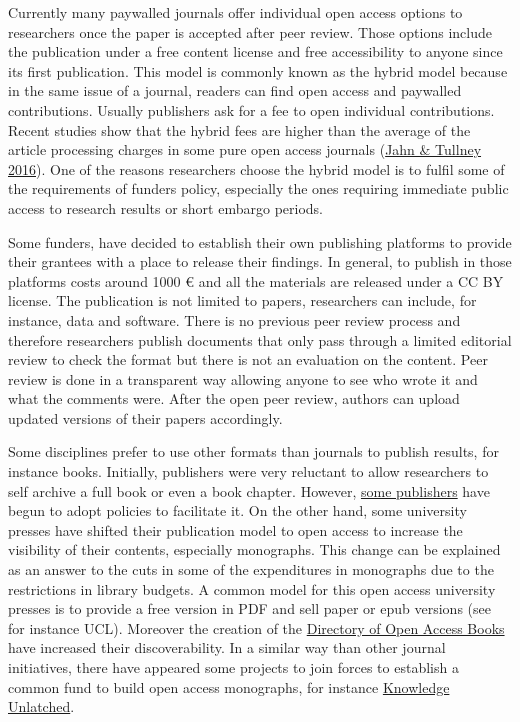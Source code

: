 \documentclass{article}
\begin{document}
Currently many paywalled journals offer individual open access options to researchers once the paper is accepted after peer review. Those options include the publication under a free content license and free accessibility to anyone since its first publication. This model is commonly known as the hybrid model because in the same issue of a journal, readers can find open access and paywalled contributions. Usually publishers ask for a fee to open individual contributions. Recent studies show that the hybrid fees are higher than the average of the article processing charges in some pure open access journals (\href{https://doi.org/10/bnqm}{Jahn \& Tullney 2016}). One of the reasons researchers choose the hybrid model is to fulfil some of the requirements of funders policy, especially the ones requiring immediate public access to research results or short embargo periods.


Some funders, have decided to establish their own publishing platforms to provide their grantees with a place to release their findings. In general, to publish in those platforms costs around 1000 € and all the materials are released under a CC BY license. The publication is not limited to papers, researchers can include, for instance, data and software. There is no previous peer review process and therefore researchers publish documents that only pass through a limited editorial review to check the format but there is not an evaluation on the content. Peer review is done in a transparent way allowing anyone to see who wrote it and what the comments were. After the open peer review, authors can upload updated versions of their papers accordingly.


Some disciplines prefer to use other formats than journals to publish results, for instance books. Initially, publishers were very reluctant to allow researchers to self archive a full book or even a book chapter. However, \href{https://docs.google.com/spreadsheets/d/1-Lq_zzaGqge8SdY1DX-YXTN43JLn75jf2OhidJqXM60/edit#gid=142126524}{some publishers} have begun to adopt policies to facilitate it. On the other hand, some university presses have shifted their publication model to open access to increase the visibility of their contents, especially monographs. This change can be explained as an answer to the cuts in some of the expenditures in monographs due to the restrictions in library budgets. A common model for this open access university presses is to provide a free version in PDF and sell paper or epub versions (see for instance UCL). Moreover the creation of the \href{https://doabooks.org/}{Directory of Open Access Books} have increased their discoverability. In a similar way than other journal initiatives, there have appeared some projects to join forces to establish a common fund to build open access monographs, for instance \href{http://www.knowledgeunlatched.org/}{Knowledge Unlatched}.
\end{document}
